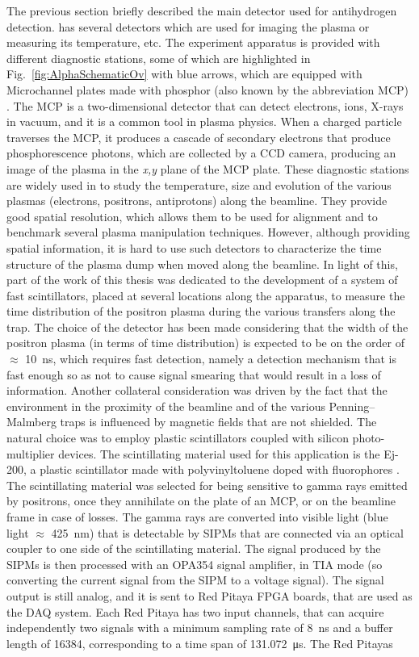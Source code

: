 The previous section briefly described the main detector used for antihydrogen detection. \ALPHA has several detectors which are used for imaging the plasma or measuring its temperature, etc.
The \ALPHA experiment apparatus is provided with different diagnostic stations, some of which are highlighted in Fig.~\ref{fig:AlphaSchematicOv} with blue arrows, which are equipped with Microchannel plates made with phosphor (also known by the abbreviation MCP) \cite{Andresen:2009mcp}. The MCP is a two-dimensional detector that can detect electrons, ions, X-rays in vacuum, and it is a common tool in plasma physics. When a charged particle traverses the MCP, it produces a cascade of secondary electrons that produce phosphorescence photons, which are collected by a CCD camera, producing an image of the plasma in the \textit{x,y} plane of the MCP plate. These diagnostic stations are widely used in \ALPHA to study the temperature, size and evolution of the various plasmas (electrons, positrons, antiprotons) along the beamline. They provide good spatial resolution, which allows them to be used for alignment and to benchmark several plasma manipulation techniques. However, although providing spatial information, it is hard to use such detectors to characterize the time structure of the plasma dump when moved along the beamline. In light of this, part of the work of this thesis was dedicated to the development of a system of fast scintillators, placed at several locations along the apparatus, to measure the time distribution of the positron plasma during the various transfers along the trap. The choice of the detector has been made considering that the width of the positron plasma (in terms of time distribution) is expected to be on the order of $\approx$ \SI{10}{\nano \second}, which requires fast detection, namely a detection mechanism that is fast enough so as not to cause signal smearing that would result in a loss of information. Another collateral consideration was driven by the fact that the environment in the proximity of the beamline and of the various Penning--Malmberg traps is influenced by magnetic fields that are not shielded. The natural choice was to employ plastic scintillators coupled with silicon photo-multiplier devices. The scintillating material used for this application is the Ej-200, a plastic scintillator made with polyvinyltoluene doped with fluorophores \cite{eljensite}. The scintillating material was selected for being sensitive to gamma rays emitted by positrons, once they annihilate on the plate of an MCP, or on the beamline frame in case of losses. The gamma rays are converted into visible light (blue light $\approx$ \SI{425}{\nano \meter}) that is detectable by SIPMs that are connected via an optical coupler to one side of the scintillating material. The signal produced by the SIPMs is then processed with an OPA354 signal amplifier, in TIA mode (so converting the current signal from the SIPM to a voltage signal). The signal output is still analog, and it is sent to Red Pitaya FPGA boards, that are used as the DAQ system. Each Red Pitaya has two input channels, that can acquire independently two signals with a minimum sampling rate of \SI{8}{\nano \second} and a buffer length of 16384, corresponding to a time span of \SI{131.072}{\micro \second}. The Red Pitayas 